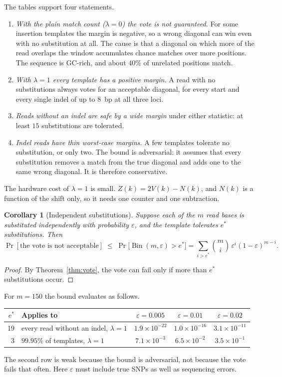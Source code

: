 \documentclass[11pt]{article}
\theoremstyle{plain}
\newtheorem{corollary}[theorem]{Corollary}
\theoremstyle{definition}
\theoremstyle{remark}
\DeclareMathOperator{\Bin}{Bin}
\begin{document}
The tables support four statements.
\begin{enumerate}
\item \emph{With the plain match count ($\lambda = 0$) the vote is not
      guaranteed.} For some insertion templates the margin is negative, so a
      wrong diagonal can win even with no substitution at all. The cause is that
      a diagonal on which more of the read overlaps the window accumulates
      chance matches over more positions. The sequence is GC-rich, and about
      $40\%$ of unrelated positions match.
\item \emph{With $\lambda = 1$ every template has a positive margin.} A read
      with no substitutions always votes for an acceptable diagonal, for every
      start and every single indel of up to $8$~bp at all three loci.
\item \emph{Reads without an indel are safe by a wide margin} under either
      statistic: at least $15$ substitutions are tolerated.
\item \emph{Indel reads have thin worst-case margins.} A few templates tolerate
      no substitution, or only two. The bound is adversarial: it assumes that
      every substitution removes a match from the true diagonal and adds one to
      the same wrong diagonal. It is therefore conservative.
\end{enumerate}

The hardware cost of $\lambda = 1$ is small. $Z(k) = 2V(k) - N(k)$, and $N(k)$
is a function of the shift only, so it needs one counter and one subtraction.

\begin{corollary}[Independent substitutions]\label{cor:prob}
Suppose each of the $m$ read bases is substituted independently with probability
$\varepsilon$, and the template tolerates $e^{*}$ substitutions. Then
\[
\Pr[\text{the vote is not acceptable}]
\;\le\; \Pr\bigl[\Bin(m,\varepsilon) > e^{*}\bigr]
= \sum_{i > e^{*}} \binom{m}{i}\,\varepsilon^{i}(1-\varepsilon)^{m-i}.
\]
\end{corollary}

\begin{proof}
By Theorem~\ref{thm:vote}, the vote can fail only if more than $e^{*}$
substitutions occur.
\end{proof}

For $m = 150$ the bound evaluates as follows.
\begin{center}
\begin{tabular}{@{}rlccc@{}}
\toprule
$e^{*}$ & Applies to & $\varepsilon = 0.005$ & $\varepsilon = 0.01$ & $\varepsilon = 0.02$ \\
\midrule
19 & every read without an indel, $\lambda = 1$
   & $1.9\times10^{-22}$ & $1.0\times10^{-16}$ & $3.1\times10^{-11}$ \\
3  & $99.95\%$ of templates, $\lambda = 1$
   & $7.1\times10^{-3}$ & $6.5\times10^{-2}$ & $3.5\times10^{-1}$ \\
\bottomrule
\end{tabular}
\end{center}
The second row is weak because the bound is adversarial, not because the vote
fails that often. Here $\varepsilon$ must include true SNPs as well as
sequencing errors.
\end{document}
